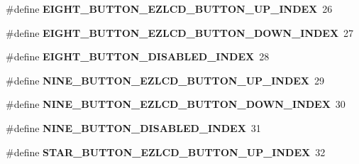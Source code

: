 \begin{DoxyCompactItemize}
\item 
\hypertarget{group__ez_l_c_d__103__user__config_gafe8273ab04aa924d5bfa05e82d954bae}{\#define {\bfseries E\-I\-G\-H\-T\-\_\-\-B\-U\-T\-T\-O\-N\-\_\-\-E\-Z\-L\-C\-D\-\_\-\-B\-U\-T\-T\-O\-N\-\_\-\-U\-P\-\_\-\-I\-N\-D\-E\-X}~26}\label{group__ez_l_c_d__103__user__config_gafe8273ab04aa924d5bfa05e82d954bae}

\item 
\hypertarget{group__ez_l_c_d__103__user__config_gac2ea3917e883f5acda52446d2507ad35}{\#define {\bfseries E\-I\-G\-H\-T\-\_\-\-B\-U\-T\-T\-O\-N\-\_\-\-E\-Z\-L\-C\-D\-\_\-\-B\-U\-T\-T\-O\-N\-\_\-\-D\-O\-W\-N\-\_\-\-I\-N\-D\-E\-X}~27}\label{group__ez_l_c_d__103__user__config_gac2ea3917e883f5acda52446d2507ad35}

\item 
\hypertarget{group__ez_l_c_d__103__user__config_gadf14e61bb5c55c148d9ef566d4a56444}{\#define {\bfseries E\-I\-G\-H\-T\-\_\-\-B\-U\-T\-T\-O\-N\-\_\-\-D\-I\-S\-A\-B\-L\-E\-D\-\_\-\-I\-N\-D\-E\-X}~28}\label{group__ez_l_c_d__103__user__config_gadf14e61bb5c55c148d9ef566d4a56444}

\item 
\hypertarget{group__ez_l_c_d__103__user__config_ga72276d98591e75ef60e7807761fe0b71}{\#define {\bfseries N\-I\-N\-E\-\_\-\-B\-U\-T\-T\-O\-N\-\_\-\-E\-Z\-L\-C\-D\-\_\-\-B\-U\-T\-T\-O\-N\-\_\-\-U\-P\-\_\-\-I\-N\-D\-E\-X}~29}\label{group__ez_l_c_d__103__user__config_ga72276d98591e75ef60e7807761fe0b71}

\item 
\hypertarget{group__ez_l_c_d__103__user__config_ga040f01e25101078b2598aa9acece154b}{\#define {\bfseries N\-I\-N\-E\-\_\-\-B\-U\-T\-T\-O\-N\-\_\-\-E\-Z\-L\-C\-D\-\_\-\-B\-U\-T\-T\-O\-N\-\_\-\-D\-O\-W\-N\-\_\-\-I\-N\-D\-E\-X}~30}\label{group__ez_l_c_d__103__user__config_ga040f01e25101078b2598aa9acece154b}

\item 
\hypertarget{group__ez_l_c_d__103__user__config_ga2a8789440173d5c288ff6b5e2a2be360}{\#define {\bfseries N\-I\-N\-E\-\_\-\-B\-U\-T\-T\-O\-N\-\_\-\-D\-I\-S\-A\-B\-L\-E\-D\-\_\-\-I\-N\-D\-E\-X}~31}\label{group__ez_l_c_d__103__user__config_ga2a8789440173d5c288ff6b5e2a2be360}

\item 
\hypertarget{group__ez_l_c_d__103__user__config_gaa42b27c1b3d22aa440e063bfd7378fbe}{\#define {\bfseries S\-T\-A\-R\-\_\-\-B\-U\-T\-T\-O\-N\-\_\-\-E\-Z\-L\-C\-D\-\_\-\-B\-U\-T\-T\-O\-N\-\_\-\-U\-P\-\_\-\-I\-N\-D\-E\-X}~32}\label{group__ez_l_c_d__103__user__config_gaa42b27c1b3d22aa440e063bfd7378fbe}


\end{DoxyCompactItemize}

